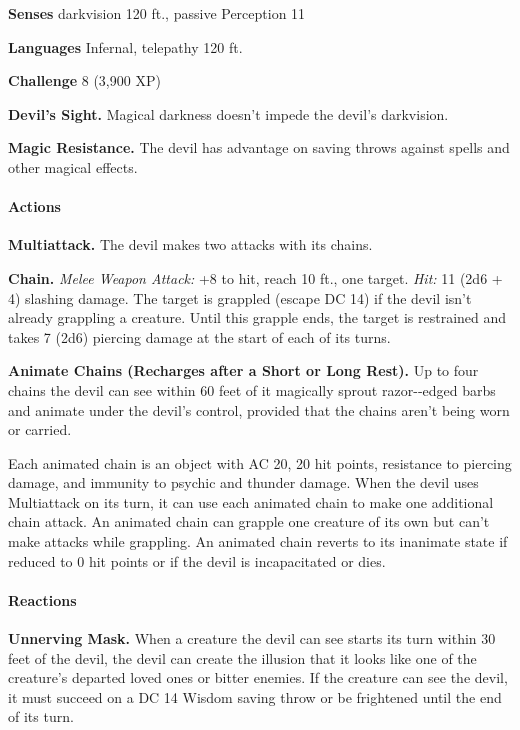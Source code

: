 \documentclass[
]{article}
\begin{document}
\textbf{Senses} darkvision 120 ft., passive Perception 11

\textbf{Languages} Infernal, telepathy 120 ft.

\textbf{Challenge} 8 (3,900 XP)

\textbf{Devil's Sight.} Magical darkness doesn't impede the devil's
darkvision.

\textbf{Magic Resistance.} The devil has advantage on saving throws
against spells and other magical effects.

\hypertarget{actions-12}{%
\paragraph{Actions}\label{actions-12}}

\textbf{Multiattack.} The devil makes two attacks with its chains.

\textbf{Chain.} \emph{Melee Weapon Attack:} +8 to hit, reach 10 ft., one
target. \emph{Hit:} 11 (2d6 + 4) slashing damage. The target is grappled
(escape DC 14) if the devil isn't already grappling a creature. Until
this grapple ends, the target is restrained and takes 7 (2d6) piercing
damage at the start of each of its turns.

\textbf{Animate Chains (Recharges after a Short or Long Rest).} Up to
four chains the devil can see within 60 feet of it magically sprout
razor-­‐edged barbs and animate under the devil's control, provided that
the chains aren't being worn or carried.

Each animated chain is an object with AC 20, 20 hit points, resistance
to piercing damage, and immunity to psychic and thunder damage. When the
devil uses Multiattack on its turn, it can use each animated chain to
make one additional chain attack. An animated chain can grapple one
creature of its own but can't make attacks while grappling. An animated
chain reverts to its inanimate state if reduced to 0 hit points or if
the devil is incapacitated or dies.

\hypertarget{reactions-1}{%
\paragraph{Reactions}\label{reactions-1}}

\textbf{Unnerving Mask.} When a creature the devil can see starts its
turn within 30 feet of the devil, the devil can create the illusion that
it looks like one of the creature's departed loved ones or bitter
enemies. If the creature can see the devil, it must succeed on a DC 14
Wisdom saving throw or be frightened until the end of its turn.
\end{document}
